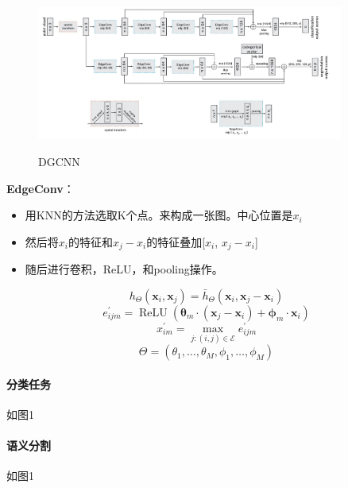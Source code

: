 \documentclass[a4paper,12pt]{article}
\begin{document}
	\begin{figure}[H]
	\begin{center}
		\includegraphics[width=0.9\textwidth]{img/DGCNN.png} 
		\caption{DGCNN}
	\end{center}
\end{figure}

\textbf{EdgeConv}：
\begin{itemize}
	\item 用KNN的方法选取K个点。来构成一张图。中心位置是$x_i$
	\item 然后将$x_i$的特征和$x_j - x_i$的特征叠加[$x_i$, $x_j-x_i$]
	\item 随后进行卷积，ReLU，和pooling操作。
\end{itemize}

$$
h_{\Theta}\left(\mathbf{x}_{i}, \mathbf{x}_{j}\right)=\bar{h}_{\Theta}\left(\mathbf{x}_{i}, \mathbf{x}_{j}-\mathbf{x}_{i}\right)
$$
$$
e_{i j m}^{\prime}=\operatorname{ReLU}\left(\boldsymbol{\theta}_{m} \cdot\left(\mathbf{x}_{j}-\mathbf{x}_{i}\right)+\boldsymbol{\phi}_{m} \cdot \mathbf{x}_{i}\right)
$$
$$
x_{i m}^{\prime}=\max _{j:(i, j) \in \mathcal{E}} e_{i j m}^{\prime}
$$
$$\Theta=\left(\theta_{1}, \ldots, \theta_{M}, \phi_{1}, \ldots, \phi_{M}\right)$$


\paragraph{分类任务}
如图1
\paragraph{语义分割} 如图1
\end{document}
